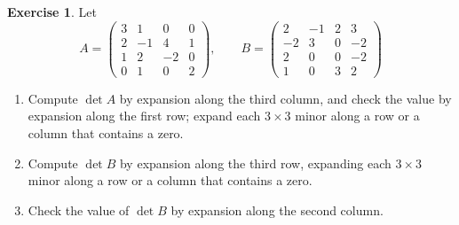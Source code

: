 \documentclass[12pt]{article}
\theoremstyle{definition}
\newtheorem{exercise}{Exercise}
\begin{document}
\begin{exercise}\label{r5d-dr-cofactor}
Let
\[
A=\begin{pmatrix}3&1&0&0\\2&-1&4&1\\1&2&-2&0\\0&1&0&2\end{pmatrix},\qquad
B=\begin{pmatrix}2&-1&2&3\\-2&3&0&-2\\2&0&0&-2\\1&0&3&2\end{pmatrix}
\]
\begin{enumerate}
\item Compute \(\det A\) by expansion along the third column, and check the value by expansion along the first row;
expand each \(3\times3\) minor along a row or a column that contains a zero.
\item Compute \(\det B\) by expansion along the third row, expanding each \(3\times3\) minor along a row or a column
that contains a zero.
\item Check the value of \(\det B\) by expansion along the second column.
\end{enumerate}
\end{exercise}
\end{document}
